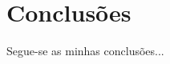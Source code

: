 \def\baselinestretch{1}
\chapter{Conclusões}

\graphicspath{{Chapters/Conclusions/ConclusionsFigs/PNG/}{Chapters/Conclusions/ConclusionsFigs/PDF/}{Chapters/Conclusions/ConclusionsFigs/}}



Segue-se as minhas conclusões...